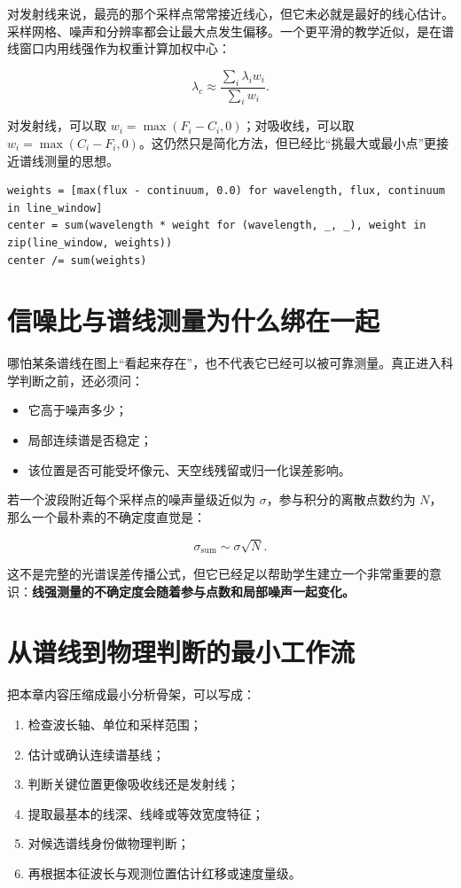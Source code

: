 对发射线来说，最亮的那个采样点常常接近线心，但它未必就是最好的线心估计。采样网格、噪声和分辨率都会让最大点发生偏移。一个更平滑的教学近似，是在谱线窗口内用线强作为权重计算加权中心：

\[
\lambda_c \approx
\frac{\sum_i \lambda_i w_i}{\sum_i w_i}.
\]

对发射线，可以取 $w_i=\max(F_i-C_i,0)$；对吸收线，可以取 $w_i=\max(C_i-F_i,0)$。这仍然只是简化方法，但已经比“挑最大或最小点”更接近谱线测量的思想。

\begin{examplebox}[教学版线心估计]
\begin{lstlisting}[style=pythonstyle]
weights = [max(flux - continuum, 0.0) for wavelength, flux, continuum in line_window]
center = sum(wavelength * weight for (wavelength, _, _), weight in zip(line_window, weights))
center /= sum(weights)
\end{lstlisting}
\end{examplebox}

\section{信噪比与谱线测量为什么绑在一起}

哪怕某条谱线在图上“看起来存在”，也不代表它已经可以被可靠测量。真正进入科学判断之前，还必须问：

\begin{itemize}
    \item 它高于噪声多少；
    \item 局部连续谱是否稳定；
    \item 该位置是否可能受坏像元、天空线残留或归一化误差影响。
\end{itemize}

若一个波段附近每个采样点的噪声量级近似为 $\sigma$，参与积分的离散点数约为 $N$，那么一个最朴素的不确定度直觉是：

\[
\sigma_{\mathrm{sum}} \sim \sigma \sqrt{N}.
\]

这不是完整的光谱误差传播公式，但它已经足以帮助学生建立一个非常重要的意识：\textbf{线强测量的不确定度会随着参与点数和局部噪声一起变化。}

\section{从谱线到物理判断的最小工作流}

把本章内容压缩成最小分析骨架，可以写成：

\begin{enumerate}
    \item 检查波长轴、单位和采样范围；
    \item 估计或确认连续谱基线；
    \item 判断关键位置更像吸收线还是发射线；
    \item 提取最基本的线深、线峰或等效宽度特征；
    \item 对候选谱线身份做物理判断；
    \item 再根据本征波长与观测位置估计红移或速度量级。
\end{enumerate}

